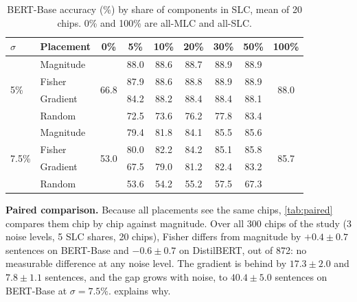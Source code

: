 \begin{table}[t]
\centering\footnotesize
\caption{BERT-Base accuracy (\%) by share of components in SLC, mean of 20 chips. 0\% and 100\% are
all-MLC and all-SLC.}\label{tab:share}
\setlength{\tabcolsep}{3.2pt}
\begin{tabular}{@{}llccccccc@{}}
\toprule
$\sigma$ & Placement & 0\% & 5\% & 10\% & 20\% & 30\% & 50\% & 100\% \\
\midrule
\multirow{4}{*}{5\%}
 & Magnitude & \multirow{4}{*}{66.8} & 88.0 & 88.6 & 88.7 & 88.9 & 88.9 & \multirow{4}{*}{88.0} \\
 & Fisher    & & 87.9 & 88.6 & 88.8 & 88.9 & 88.9 & \\
 & Gradient  & & 84.2 & 88.2 & 88.4 & 88.4 & 88.1 & \\
 & Random    & & 72.5 & 73.6 & 76.2 & 77.8 & 83.4 & \\
\midrule
\multirow{4}{*}{7.5\%}
 & Magnitude & \multirow{4}{*}{53.0} & 79.4 & 81.8 & 84.1 & 85.5 & 85.6 & \multirow{4}{*}{85.7} \\
 & Fisher    & & 80.0 & 82.2 & 84.2 & 85.1 & 85.8 & \\
 & Gradient  & & 67.5 & 79.0 & 81.2 & 82.4 & 83.2 & \\
 & Random    & & 53.6 & 54.2 & 55.2 & 57.5 & 67.3 & \\
\bottomrule
\end{tabular}
\end{table}

\textbf{Paired comparison.} Because all placements see the same chips, \cref{tab:paired} compares them
chip by chip against magnitude. Over all 300 chips of the study (3 noise levels, 5 SLC shares, 20 chips),
Fisher differs from magnitude by $+0.4\pm0.7$ sentences on BERT-Base and $-0.6\pm0.7$ on DistilBERT, out
of 872: no measurable difference at any noise level. The gradient is behind by $17.3\pm2.0$ and
$7.8\pm1.1$ sentences, and the gap grows with noise, to $40.4\pm5.0$ sentences on BERT-Base at
$\sigma=7.5\%$.  explains why.

